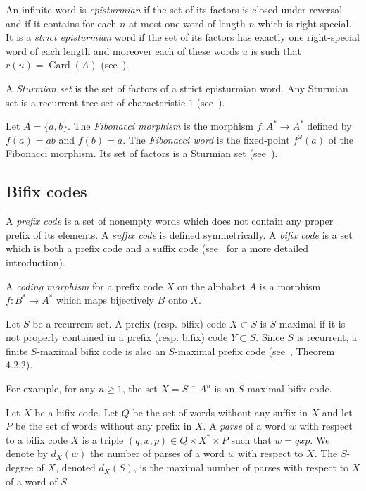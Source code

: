 \documentclass[preprint,12pt]{elsarticle}
\DeclareMathOperator{\Card}{Card}
\numberwithin{theorem}{section}
\numberwithin{equation}{section}
\numberwithin{figure}{section}
\numberwithin{table}{section}
\begin{document}
An infinite word is \emph{episturmian} if the set of its factors is closed under reversal and if it contains for each $n$ at most one word of length $n$ which is right-special.
It is a \emph{strict episturmian} word if the set of its factors has exactly one right-special word of each length and moreover each of these words $u$ is such that $r(u)=\Card(A)$ (see~\cite{BerstelDeFelicePerrinReutenauerRindone2012}).

A \emph{Sturmian set} is the set of factors of a strict episturmian word.
Any Sturmian set is a recurrent tree set of characteristic $1$ (see~\cite{BertheDeFeliceDolceLeroyPerrinReutenauerRindone2013a}). 

\begin{example}
\label{exampleFibo}
Let $A=\{a,b\}$. The \emph{Fibonacci morphism} is the morphism $f:A^*\rightarrow A^*$ defined by $f(a)=ab$ and $f(b)=a$.
The \emph{Fibonacci word} is the fixed-point $f^\omega(a)$ of the Fibonacci morphism.
Its set of factors is a Sturmian set (see~\cite{Lothaire2002}).
\end{example}





\subsection{Bifix codes}
\label{sectionBifix}

A \emph{prefix code} is a set of nonempty words which does not contain any
proper prefix of its elements. A \emph{suffix code} is defined symmetrically.
A \emph{bifix code} is a set which is both a prefix code and a suffix code
(see~\cite{BerstelPerrinReutenauer2009} for a more detailed introduction).

A \emph{coding morphism} for a prefix code $X$ on the alphabet $A$
is a morphism $f:B^*\rightarrow A^*$ which maps bijectively $B$ onto $X$.

Let $S$ be a recurrent set.
A prefix (resp. bifix) code $X\subset S$ is $S$-maximal if it is not properly contained
in a prefix (resp. bifix) code $Y\subset S$. 
Since $S$ is recurrent, a finite $S$-maximal bifix code is also an
$S$-maximal prefix code 
(see~\cite{BerstelDeFelicePerrinReutenauerRindone2012}, Theorem 4.2.2).

For example, for any $n\ge 1$, the set $X=S\cap A^n$ is an $S$-maximal
bifix code.

Let $X$ be a bifix code. Let $Q$ be the set of words without any suffix in $X$
and let $P$ be the set of words without any prefix in $X$.
A \emph{parse} of a word $w$ with respect to a bifix code $X$
is a triple $(q,x,p)\in Q\times X^*\times P$ such that $w=qxp$. 
We denote by $d_X(w)$ the number of parses of a word $w$
with respect to $X$. The $S$-degree of $X$, denoted $d_X(S)$, is
the maximal number of parses with respect to $X$ of a word of $S$.
\end{document}
